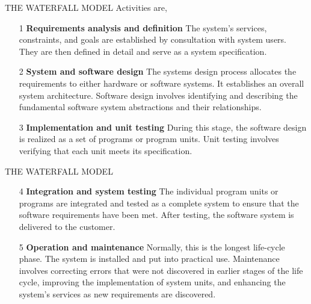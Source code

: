 \documentclass{beamer}
\begin{document}
\begin{frame}{THE WATERFALL MODEL}
Activities are,
\begin{itemize}
	\item[1] \textbf{Requirements analysis and definition} The system’s services, constraints, and goals are established   by consultation with system users. They are then defined in detail and serve as a system specification.
	\item[2] \textbf{ System and software design} The systems design process allocates the requirements to either hardware or software systems. It establishes an overall system architecture. Software design involves identifying and describing the fundamental software system abstractions and their relationships.
	\item[3] \textbf{Implementation and unit testing} During this stage, the software design is realized as a set of programs or program units. Unit testing involves verifying that each unit meets its specification.
	
\end{itemize}
\end{frame}
\begin{frame}{THE WATERFALL MODEL}
	\begin{itemize}
		\item[4] \textbf{Integration and system testing} The individual program units or programs are integrated and tested as a complete system to ensure that the software requirements have been met. After testing, the software system is delivered to the customer.
		\item[5] \textbf{Operation and maintenance} Normally, this is the longest life-cycle phase. The system is installed and put into practical use. Maintenance involves correcting errors that were not discovered in earlier stages of the life cycle, improving the implementation of system units, and enhancing the system’s services as new requirements are discovered.
	\end{itemize}
\end{frame}
\end{document}
